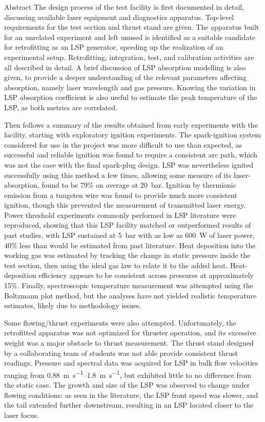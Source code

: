 \begin{plainchp}{Abstract}
    The design process of the test facility is first documented in detail, discussing available laser equipment and diagnostics apparatus. Top-level requirements for the test section and thrust stand are given. The apparatus built for an unrelated experiment and left unused is identified as a suitable candidate for retrofitting as an LSP generator, speeding up the realization of an experimental setup. Retrofitting, integration, test, and calibration activities are all described in detail. A brief discussion of LSP absorption modelling is also given, to provide a deeper understanding of the relevant parameters affecting absorption, namely laser wavelength and gas pressure. Knowing the variation in LSP absorption coefficient is also useful to estimate the peak temperature of the LSP, as both metrics are correlated.

    Then follows a summary of the results obtained from early experiments with the facility, starting with exploratory ignition experiments. The spark-ignition system considered for use in the project was more difficult to use than expected, as successful and reliable ignition was found to require a consistent arc path, which was not the case with the final spark-plug design. LSP was nevertheless ignited successfully using this method a few times, allowing some measure of its laser-absorption, found to be 79\% on average at \qty{20}{bar}. Ignition by thermionic emission from a tungsten wire was found to provide much more consistent ignition, though this prevented the measurement of transmitted laser energy. Power threshold experiments commonly performed in LSP literature were reproduced, showing that this LSP facility matched or outperformed results of past studies, with LSP sustained at \qty{5}{bar} with as low as \qty{600}{W} of laser power, 40\% less than would be estimated from past literature. Heat deposition into the working gas was estimated by tracking the change in static pressure inside the test section, then using the ideal gas law to relate it to the added heat. Heat-deposition efficiency appears to be consistent across pressures at approximately 15\%. Finally, spectroscopic temperature measurement was attempted using the Boltzmann plot method, but the analyses have not yielded realistic temperature estimates, likely due to methodology issues.

    Some flowing/thrust experiments were also attempted. Unfortunately, the retrofitted apparatus was not optimized for thruster operation, and its excessive weight was a major obstacle to thrust measurement. The thrust stand designed by a collaborating team of students was not able provide consistent thrust readings. Pressure and spectral data was acquired for LSP in bulk flow velocities ranging from \qtyrange{0.88}{1.8}{m.s^{-1}}, but exhibited little to no difference from the static case. The growth and size of the LSP was observed to change under flowing conditions: as seen in the literature, the LSP front speed was slower, and the tail extended further downstream, resulting in an LSP located closer to the laser focus.


\end{plainchp}
